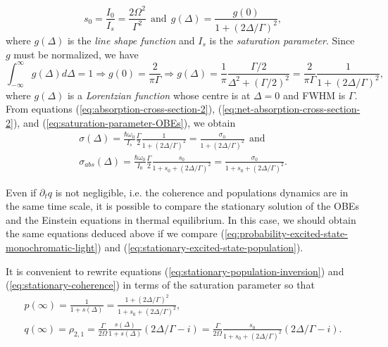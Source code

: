{\begin{equation}
	s_0 = \frac{I_0}{I_s} = \frac{2\Omega^2}{\Gamma^2}\ \ \textrm{and}\ \ g(\Delta) = \frac{g(0)}{1 + (2\Delta/\Gamma)^2},
\end{equation}
where $ g(\Delta) $ is the \textit{line shape function} and $ I_s $ is the \textit{saturation parameter}. Since $ g $ must be normalized, we have
\begin{equation}
	\int_{-\infty}^{\infty} g(\Delta) d\Delta = 1 \Rightarrow g(0) = \frac{2}{\pi \Gamma} \Rightarrow g(\Delta) = \frac{1}{\pi} \frac{\Gamma/2}{\Delta^2 + (\Gamma/2)^2} = \frac{2}{\pi \Gamma} \frac{1}{1 + (2\Delta / \Gamma)^2},
	\label{eq:line-shape-function-2}
\end{equation}
where $ g(\Delta) $ is a \textit{Lorentzian function} whose centre is at $ \Delta = 0 $ and FWHM is $ \Gamma $. From equations (\ref{eq:absorption-cross-section-2}), (\ref{eq:net-absorption-cross-section-2}), and (\ref{eq:saturation-parameter-OBEs}), we obtain
\begin{gather}
	\sigma(\Delta) = \frac{\hbar \omega_0}{I_s} \frac{\Gamma}{2} \frac{1}{1 + (2\Delta/\Gamma)^2} = \frac{\sigma_0}{1 + (2\Delta / \Gamma)^2}\ \ \textrm{and}
	\label{eq:absorption-cross-section-3}
	\\
	\sigma_{abs}(\Delta) = \frac{\hbar \omega_0}{I_0} \frac{\Gamma}{2} \frac{s_0}{1 + s_0 + (2\Delta / \Gamma)^2} = \frac{\sigma_0}{1 + s_0 + (2\Delta / \Gamma)^2}.
	\label{eq:net-absorption-cross-section-3}
\end{gather}

Even if $ \partial_t q $ is not negligible, i.e. the coherence and populations dynamics are in the same time scale, it is possible to compare the stationary solution of the OBEs and the Einstein equations in thermal equilibrium. In this case, we should obtain the same equations deduced above if we compare (\ref{eq:probability-excited-state-monochromatic-light}) and (\ref{eq:stationary-excited-state-population}).

It is convenient to rewrite equations (\ref{eq:stationary-population-inversion}) and (\ref{eq:stationary-coherence}) in terms of the saturation parameter so that
\begin{gather}
	p(\infty) = \frac{1}{1 + s(\Delta)} = \frac{1 + (2\Delta / \Gamma)^2}{1 + s_0 + (2\Delta / \Gamma)^2},
	\label{eq:population-inversion-OBEs-2}
	\\
	q(\infty) = \rho_{2,1} = \frac{\Gamma}{2\Omega} \frac{s(\Delta)}{1 + s(\Delta)} (2\Delta / \Gamma - i) = \frac{\Gamma}{2\Omega} \frac{s_0}{1 + s_0 + (2\Delta/\Gamma)^2} (2\Delta / \Gamma - i).
	\label{eq:coherence-OBEs-2}
\end{gather}

}
